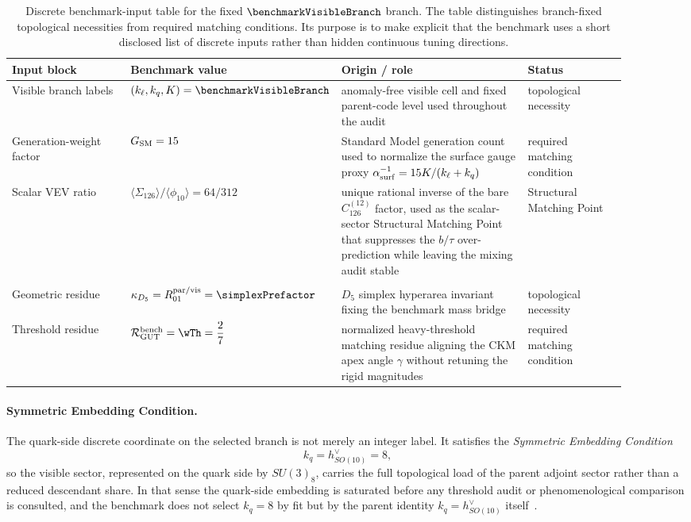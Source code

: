 \documentclass[11pt]{article}
\begin{document}
\begin{table}[t]
\centering
\small
{\setlength{\tabcolsep}{4pt}
\begin{tabular}{@{}>{\raggedright\arraybackslash}p{0.22\linewidth}>{\raggedright\arraybackslash}p{0.16\linewidth}>{\raggedright\arraybackslash}p{0.34\linewidth}>{\raggedright\arraybackslash}p{0.18\linewidth}@{}}
\hline
Input block & Benchmark value & Origin / role & Status \\
\hline
Visible branch labels & $(k_{\ell},k_q,K)=\benchmarkVisibleBranch$ & anomaly-free visible cell and fixed parent-code level used throughout the audit & topological necessity \\
Generation-weight factor & $G_{\rm SM}=15$ & Standard Model generation count used to normalize the surface gauge proxy $\alpha^{-1}_{\rm surf}=15K/(k_{\ell}+k_q)$ & required matching condition \\
Scalar VEV ratio & $\langle \Sigma_{126} \rangle / \langle \phi_{10} \rangle = 64/312$ & unique rational inverse of the bare $C_{126}^{(12)}$ factor, used as the scalar-sector Structural Matching Point that suppresses the $b/\tau$ over-prediction while leaving the mixing audit stable & Structural Matching Point \\\\
Geometric residue & $\kappa_{D_5}=R_{01}^{\rm par/vis}=\simplexPrefactor$ & $D_5$ simplex hyperarea invariant fixing the benchmark mass bridge & topological necessity \\
Threshold residue & $\mathcal R_{\rm GUT}^{\rm bench}=\wTh=\dfrac{2}{7}$ & normalized heavy-threshold matching residue aligning the CKM apex angle $\gamma$ without retuning the rigid magnitudes & required matching condition \\
\hline
\end{tabular}}
\caption{Discrete benchmark-input table for the fixed $\benchmarkVisibleBranch$ branch. The table distinguishes branch-fixed topological necessities from required matching conditions. Its purpose is to make explicit that the benchmark uses a short disclosed list of discrete inputs rather than hidden continuous tuning directions.}
\label{tab:s2-discrete-input-status}
\end{table}

\paragraph*{Symmetric Embedding Condition.}
The quark-side discrete coordinate on the selected branch is not merely an
integer label. It satisfies the \emph{Symmetric Embedding Condition}
\begin{equation}
 k_q=h^{\vee}_{SO(10)}=8,
\end{equation}
so the visible sector, represented on the quark side by $SU(3)_8$, carries the
full topological load of the parent adjoint sector rather than a reduced
descendant share. In that sense the quark-side embedding is saturated before
any threshold audit or phenomenological comparison is consulted, and the
benchmark does not select $k_q=8$ by fit but by the parent identity
$k_q=h^{\vee}_{SO(10)}$ itself~\cite{gko1985,witten1989}.
\end{document}
